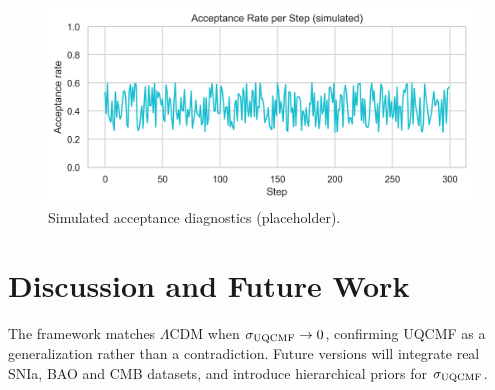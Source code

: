 \documentclass[11pt]{article}
\begin{document}
\begin{figure}[h]
  \centering
  \includegraphics[width=0.8\linewidth]{figures/acceptance_diagnostics.png}
  \caption{Simulated acceptance diagnostics (placeholder).}
\end{figure}
\section{Discussion and Future Work}
The framework matches $\Lambda$CDM when $\sigma_{\rm UQCMF}\to 0$, confirming UQCMF as a generalization rather than a contradiction. Future versions will integrate real SNIa, BAO and CMB datasets, and introduce hierarchical priors for $\sigma_{\rm UQCMF}$.
\end{document}
